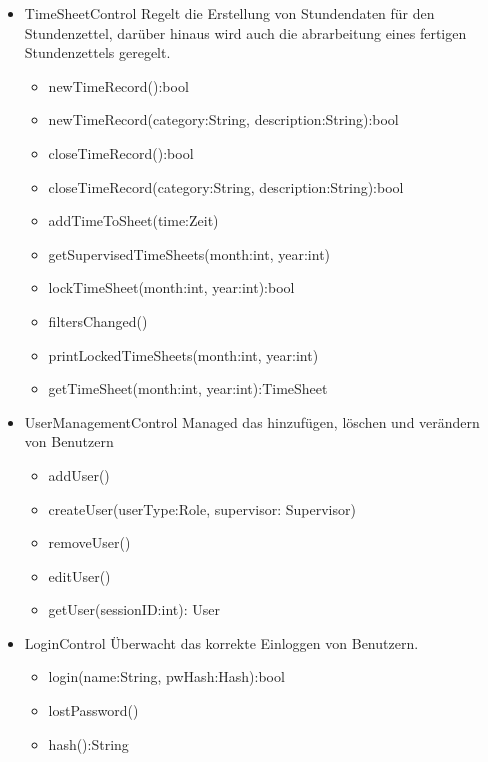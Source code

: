 \begin{itemize}
\begin{itemize}
\begin{itemize}
                    \item{TimeSheetControl}
                        Regelt die Erstellung von Stundendaten für den Stundenzettel, darüber hinaus wird auch die abrarbeitung eines fertigen Stundenzettels geregelt.
                        \begin{itemize}
                             \item{newTimeRecord():bool}
                             \item{newTimeRecord(category:String, description:String):bool}
                             \item{closeTimeRecord():bool}
                             \item{closeTimeRecord(category:String, description:String):bool}
                             \item{addTimeToSheet(time:Zeit)}
                             \item{getSupervisedTimeSheets(month:int, year:int)}
                             \item{lockTimeSheet(month:int, year:int):bool}
                             \item{filtersChanged()}
                             \item{printLockedTimeSheets(month:int, year:int)}
                             \item{getTimeSheet(month:int, year:int):TimeSheet}
                        \end{itemize}

                    \item{UserManagementControl}
                        Managed das hinzufügen, löschen und verändern von Benutzern
                        \begin{itemize}
                             \item{addUser()}
                             \item{createUser(userType:Role, supervisor: Supervisor)}
                             \item{removeUser()}
                             \item{editUser()}
                             \item{getUser(sessionID:int): User}
                        \end{itemize}

                    \item{LoginControl}
                        Überwacht das korrekte Einloggen von Benutzern.
                        \begin{itemize}
                             \item{login(name:String, pwHash:Hash):bool}
                             \item{lostPassword()}
                             \item{hash():String}
                        \end{itemize}


\end{itemize}
\end{itemize}
\end{itemize}
